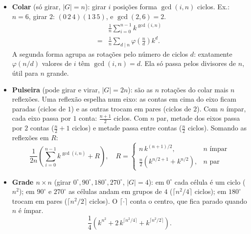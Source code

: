 \begin{itemize}
  \item \textbf{Colar} (só girar, $|G| = n$): girar $i$ posições forma $\gcd(i, n)$ ciclos.
        Ex.: $n = 6$, girar $2$: $(0\,2\,4)(1\,3\,5)$, e $\gcd(2, 6) = 2$.
        \begin{align*}
          & \frac{1}{n} \sum_{i=0}^{n-1} k^{\gcd(i, n)} \\
          = {} & \frac{1}{n} \sum_{d \mid n} \varphi\!\left(\tfrac{n}{d}\right) k^{d}.
        \end{align*}
        A segunda forma agrupa as rotações pelo número de ciclos $d$: exatamente $\varphi(n/d)$ valores de $i$ têm
        $\gcd(i, n) = d$. Ela só passa pelos divisores de $n$, útil para $n$ grande.

  \item \textbf{Pulseira} (pode girar e virar, $|G| = 2n$): são as $n$ rotações do colar mais $n$ reflexões. Uma reflexão
        espelha num eixo: as contas em cima do eixo ficam paradas (ciclos de $1$) e as outras trocam em pares (ciclos de $2$).
        Com $n$ ímpar, cada eixo passa por $1$ conta: $\frac{n+1}{2}$ ciclos. Com $n$ par, metade dos eixos passa por
        $2$ contas ($\frac{n}{2} + 1$ ciclos) e metade passa entre contas ($\frac{n}{2}$ ciclos). Somando as reflexões em $R$:
        \[
        \frac{1}{2n}\left(\sum_{i=0}^{n-1} k^{\gcd(i, n)} + R\right), \quad
        R = \begin{cases}
          n\,k^{(n+1)/2}, & n \text{ ímpar} \\
          \frac{n}{2}\left(k^{n/2+1} + k^{n/2}\right), & n \text{ par}
        \end{cases}
        \]

  \item \textbf{Grade $n \times n$} (girar $0^\circ, 90^\circ, 180^\circ, 270^\circ$, $|G| = 4$): em $0^\circ$ cada célula é um
        ciclo ($n^2$); em $90^\circ$ e $270^\circ$ as células andam em grupos de $4$ ($\lceil n^2/4 \rceil$ ciclos); em
        $180^\circ$ trocam em pares ($\lceil n^2/2 \rceil$ ciclos). O $\lceil \cdot \rceil$ conta o centro, que fica parado
        quando $n$ é ímpar.
        \[ \frac{1}{4}\left(k^{n^2} + 2\,k^{\lceil n^2/4 \rceil} + k^{\lceil n^2/2 \rceil}\right). \]
\end{itemize}
